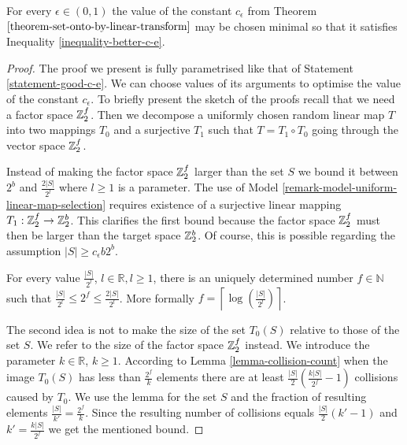 \begin{statement}
\label{statement-better-c-e}
For every $\epsilon \in (0, 1)$ the value of the constant $c_\epsilon$ from Theorem $\ref{theorem-set-onto-by-linear-transform}$ may be chosen minimal so that it satisfies Inequality \ref{inequality-better-c-e}.
\end{statement}
\begin{proof}
The proof we present is fully parametrised like that of Statement \ref{statement-good-c-e}. We can choose values of its arguments to optimise the value of the constant $c_\epsilon$. To briefly present the sketch of the proofs recall that we need a factor space $\mathbb{Z}_{2}^{f}$. Then we decompose a uniformly chosen random linear map $T$ into two mappings $T_0$ and a surjective $T_1$ such that $T = T_1 \circ T_0$ going through the vector space $\mathbb{Z}_{2}^{f}$.

Instead of making the factor space $\mathbb{Z}_{2}^{f}$ larger than the set $S$ we bound it between $2 ^ b$ and $\frac{2|S|}{2 ^ l}$ where $l \geq 1$ is a parameter. The use of Model \ref{remark-model-uniform-linear-map-selection} requires existence of a surjective linear mapping $T_1: \mathbb{Z}_{2}^{f} \rightarrow \mathbb{Z}_{2}^{b}$. This clarifies the first bound because the factor space $\mathbb{Z}_{2}^{f}$ must then be larger than the target space $\mathbb{Z}_{2}^{b}$. Of course, this is possible regarding the assumption $|S| \geq c_\epsilon b 2 ^ b$.

For every value $\frac{|S|}{2^l}$, $l \in \mathbb{R}, l \geq 1$, there is an uniquely determined number $f \in \mathbb{N}$ such that $\frac{|S|}{2 ^ l} \leq 2 ^ f \leq \frac{2|S|}{2 ^ l}$. More formally $f = \left\lceil \log \left( \frac{|S|}{2 ^ l} \right) \right\rceil$. 

The second idea is not to make the size of the set $T_0(S)$ relative to those of the set $S$. We refer to the size of the factor space $\mathbb{Z}_{2}^{f}$ instead. We introduce the parameter $k \in \mathbb{R}$, $k \geq 1$. According to Lemma \ref{lemma-collision-count} when the image $T_0(S)$ has less than $\frac{2 ^ f}{k}$ elements there are at least $\frac{|S|}{2}\left(\frac{k|S|}{2 ^ f} - 1\right)$ collisions caused by $T_0$. We use the lemma for the set $S$ and the fraction of resulting elements $\frac{|S|}{k'} = \frac{2 ^ f}{k}$. Since the resulting number of collisions equals $\frac{|S|}{2}(k' - 1)$ and $k' = \frac{k|S|}{2 ^ f}$ we get the mentioned bound.


\end{proof}
